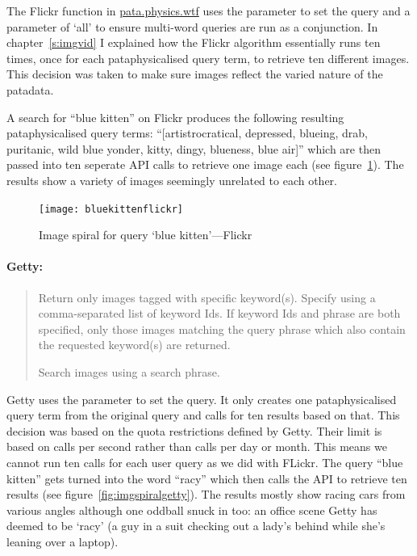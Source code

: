 The Flickr function in \url{pata.physics.wtf} uses the  parameter to set the query and a  parameter of `all' to ensure multi-word queries are run as a conjunction. In chapter~\ref{s:imgvid} I explained how the Flickr algorithm essentially runs ten times, once for each pataphysicalised query term, to retrieve ten different images. This decision was taken to make sure images reflect the varied nature of the patadata.

A search for ``blue kitten'' on Flickr produces the following resulting pataphysicalised query terms: ``[artistrocratical, depressed, blueing, drab, puritanic, wild blue yonder, kitty, dingy, blueness, blue air]'' which are then passed into ten seperate \ac{API} calls to retrieve one image each (see figure~\ref{fig:imgspiralflickr}). The results show a variety of images seemingly unrelated to each other. 

\begin{figure}[!htbp]
\centering
  \texttt{[image: bluekittenflickr]}
\caption[Image spiral `blue kitten'---Flickr]{Image spiral for query `blue kitten'---Flickr}
\label{fig:imgspiralflickr}
\end{figure}

\paragraph{Getty:}
\begin{quotation}
  \begin{description}
  \vspace{-1cm}
    \item[keyword\_ids] Return only images tagged with specific keyword(s). Specify using a comma-separated list of keyword Ids. If keyword Ids and phrase are both specified, only those images matching the query phrase which also contain the requested keyword(s) are returned.
    \item[phrase] Search images using a search phrase.
  \end{description}
\end{quotation}

Getty uses the  parameter to set the query. It only creates one pataphysicalised query term from the original query and calls for ten results based on that. This decision was based on the quota restrictions defined by Getty. Their limit is based on calls per second rather than calls per day or month. This means we cannot run ten calls for each user query as we did with FLickr. The query ``blue kitten'' gets turned into the word ``racy'' which then calls the \ac{API} to retrieve ten results (see figure~\ref{fig:imgspiralgetty}). The results mostly show racing cars from various angles although one oddball snuck in too: an office scene Getty has deemed to be `racy' (a guy in a suit checking out a lady's behind while she's leaning over a laptop).

